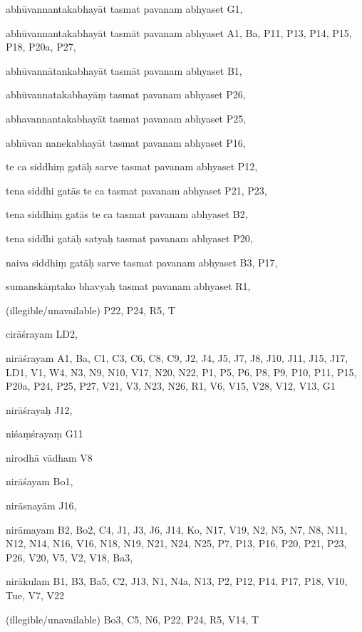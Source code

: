 \begin{ekdosis}
\begin{marma}[hp01_055]
\begin{marma}[hp02_009]
\begin{marma}[hp02_011]
\begin{marma}[hp02_39cd]
\item[abhūvannantakabhayāt tasmat pavanam abhyaset] G1,
\item[abhūvannantakabhayāt tasmāt pavanam abhyaset] A1, Ba, P11, P13, P14, P15, P18, P20a, P27,
\item[abhūvannātankabhayāt tasmāt pavanam abhyaset] B1,
\item[abhūvannatakabhayāṃ tasmat pavanam abhyaset] P26,
\item[abhavannantakabhayāt tasmat pavanam abhyaset] P25,
\item[abhūvan nanekabhayāt tasmat pavanam abhyaset] P16,
\item[te ca siddhiṃ gatāḥ sarve tasmat pavanam abhyaset] P12,
\item[tena siddhi gatās te ca tasmat pavanam abhyaset] P21, P23, 
\item[tena siddhiṃ gatās te ca tasmat pavanam abhyaset] B2, 
\item[tena siddhi gatāḥ satyaḥ tasmat pavanam abhyaset] P20,
\item[naiva siddhiṃ gatāḥ sarve tasmat pavanam abhyaset] B3, P17,
\item[sumanskāṃtako bhavyaḥ tasmat pavanam abhyaset] R1,
\item[(illegible/unavailable)] P22, P24, R5, T
  \begin{description}

    \end{description}
 \end{marma}


 \begin{marma}[hp02_40b]
\item[cirāśrayam] LD2,
\item[nirāśrayam] A1, Ba, C1, C3, C6, C8, C9, J2, J4, J5, J7, J8, J10, J11, J15, J17, LD1, V1, W4, N3, N9, N10, V17, N20, N22, P1, P5, P6, P8, P9, P10, P11, P15, P20a, P24, P25, P27, V21, V3, N23, N26, R1, V6, V15, V28, V12, V13, G1
\item[nirāśrayaḥ] J12,
\item[niśaṃśrayaṃ] G11
\item[nirodhā vādham] V8
\item[nirāśayam] Bo1,
\item[nirāsnayām] J16,
\item[nirāmayam] B2, Bo2, C4, J1, J3, J6, J14, Ko, N17, V19, N2, N5, N7, N8, N11, N12, N14, N16, V16, N18, N19, N21, N24, N25, P7, P13, P16, P20, P21, P23, P26, V20, V5, V2, V18, Ba3,
\item[nirākulam] B1, B3, Ba5, C2, J13, N1, N4a, N13, P2, P12, P14, P17, P18, V10, Tue, V7, V22
\item[(illegible/unavailable)] Bo3, C5, N6, P22, P24, R5, V14, T
  \begin{description}


\end{description}
\end{marma}
\end{marma}
\end{marma}
\end{marma}
\end{ekdosis}
